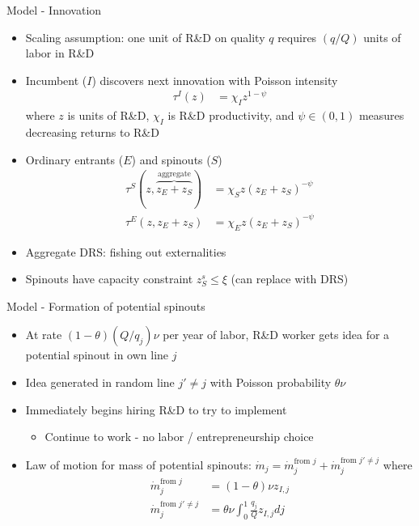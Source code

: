 \documentclass[english,usenames,dvipsnames]{beamer}
\begin{document}
\begin{frame}{Model - Innovation}
\begin{itemize}
	\item Scaling assumption: one unit of R\&D on quality $q$ requires $(q/Q)$ units of labor in R\&D
	\item Incumbent ($I$) discovers next innovation with Poisson intensity
	\begin{align*}
	\tau^I(z) &= \chi_I z^{1-\psi}
	\end{align*}
	where $z$ is units of R\&D, $\chi_I$ is R\&D productivity, and $\psi \in (0,1)$ measures decreasing returns to R\&D 
	\item Ordinary entrants ($E$) and spinouts ($S$) 
	\begin{align*}
	\tau^S(z,\overbrace{z_E+z_S}^{\textrm{aggregate}}) &= \chi_{S} z (z_E + z_S)^{-\psi} \\
	\tau^E(z,z_E+z_S) &= \chi_{E} z (z_E + z_S)^{-\psi}
	\end{align*}
	\item Aggregate DRS: \alert{fishing out} externalities
	\item Spinouts have \alert{capacity constraint} $z_S^s \le \xi$ (can replace with DRS)
\end{itemize}
\end{frame}



\begin{frame}{Model - Formation of potential spinouts}
\begin{itemize}
	\item At rate $(1-\theta)(Q/q_j) \nu$ per year of labor, R\&D worker gets idea for a potential spinout in own line $j$
	\item Idea generated in random line $j' \ne j$ with Poisson probability $\theta \nu$ 
	\item Immediately begins hiring R\&D to try to implement
	\begin{itemize}
		\item Continue to work - no labor / entrepreneurship choice
	\end{itemize}
	\item Law of motion for mass of potential spinouts: $\dot{m}_j = \dot{m}_j^{\textrm{from $j$}} + \dot{m}_j^{\textrm{from $j' \ne j$}}$ where
	\begin{align*}
	\dot{m}_j^{\textrm{from $j$}}&= (1-\theta) \nu z_{I,j}\\
	\dot{m}_j^{\textrm{from $j' \ne j$}} &= \theta \nu \int_0^1 \frac{q_j}{Q} z_{I,j} dj
	\end{align*}
\end{itemize}
\end{frame}
\end{document}
